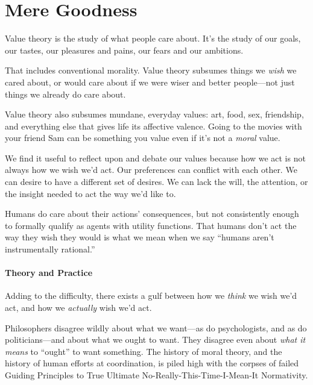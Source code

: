 \part{Mere Goodness}





 Value theory is the study of what people care about.
It's the study of our goals, our tastes, our pleasures
and pains, our fears and our ambitions.


 That includes conventional morality. Value theory subsumes things
we \textit{wish} we cared about, or would care about if we were wiser
and better people---not just things we already do care about.


 Value theory also subsumes mundane, everyday values: art, food,
sex, friendship, and everything else that gives life its affective
valence. Going to the movies with your friend Sam can be something you
value even if it's not a \textit{moral} value.


 We find it useful to reflect upon and debate our values because
how we act is not always how we wish we'd act. Our
preferences can conflict with each other. We can desire to have a
different set of desires. We can lack the will, the attention, or the
insight needed to act the way we'd like to.


 Humans do care about their actions' consequences,
but not consistently enough to formally qualify as agents with utility
functions. That humans don't act the way they wish they
would is what we mean when we say ``humans
aren't instrumentally rational.''


\subsection{Theory and Practice}


 Adding to the difficulty, there exists a gulf between how we
\textit{think} we wish we'd act, and how we
\textit{actually} wish we'd act.


 Philosophers disagree wildly about what we want---as do
psychologists, and as do politicians---and about what we ought to want.
They disagree even about \textit{what it means} to
``ought'' to want something. The
history of moral theory, and the history of human efforts at
coordination, is piled high with the corpses of failed Guiding
Principles to True Ultimate No-Really-This-Time-I-Mean-It Normativity.


